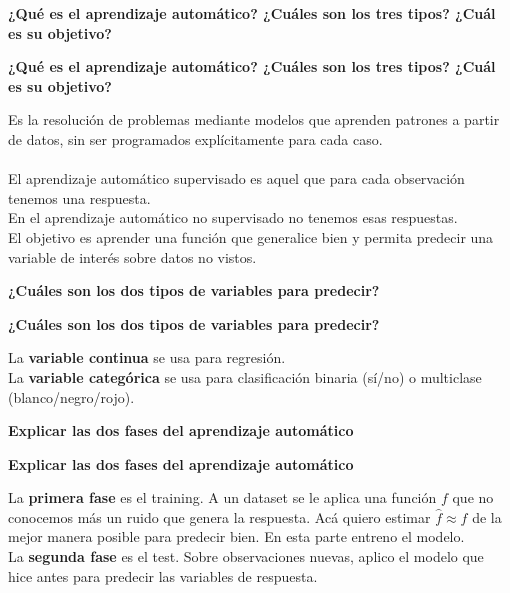 \documentclass[10pt]{memoir}
\begin{document}
\clearpage
\begin{center}
	\textbf{\Large ¿Qué es el aprendizaje automático? ¿Cuáles son los tres tipos? ¿Cuál es su objetivo?} \\
\end{center}

\clearpage
\begin{center}
	\textbf{\Large ¿Qué es el aprendizaje automático? ¿Cuáles son los tres tipos? ¿Cuál es su objetivo?} \\
\end{center}
\noindent Es la resolución de problemas mediante modelos que aprenden patrones a partir de datos, sin ser programados explícitamente para cada caso. \\
\\
\noindent El aprendizaje automático supervisado es aquel que para cada observación tenemos una respuesta. \\
En el aprendizaje automático no supervisado no tenemos esas respuestas. \\
El objetivo es aprender una función que generalice bien y permita predecir una variable de interés sobre datos no vistos. \\

\clearpage
\begin{center}
	\textbf{\Large ¿Cuáles son los dos tipos de variables para predecir?} \\
\end{center}

\clearpage
\begin{center}
	\textbf{\Large ¿Cuáles son los dos tipos de variables para predecir?} \\
\end{center}
\noindent La \textbf{variable continua} se usa para regresión. \\
La \textbf{variable categórica} se usa para clasificación binaria (sí/no) o multiclase (blanco/negro/rojo).

\clearpage
\begin{center}
	\textbf{\Large Explicar las dos fases del aprendizaje automático} \\
\end{center}

\clearpage
\begin{center}
	\textbf{\Large Explicar las dos fases del aprendizaje automático} \\
\end{center}
\noindent La \textbf{primera fase} es el training. A un dataset se le aplica una función $f$ que no conocemos más un ruido que genera la respuesta. Acá quiero estimar $\hat{f} \approx f$ de la mejor manera posible para predecir bien. En esta parte entreno el modelo. \\
La \textbf{segunda fase} es el test. Sobre observaciones nuevas, aplico el modelo que hice antes para predecir las variables de respuesta.
\end{document}

